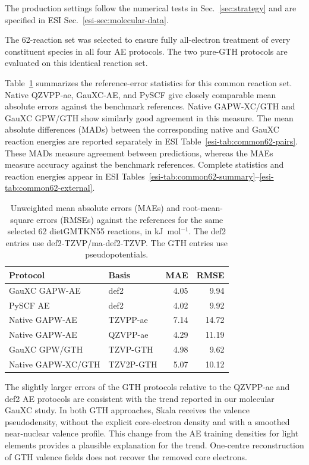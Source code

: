 \documentclass[10pt,a4paper,twocolumn]{article}
\begin{document}
 The production settings follow the numerical tests in Sec.~\ref{sec:strategy} and are specified in ESI Sec.~\ref{esi-sec:molecular-data}.

The 62-reaction set was selected to ensure fully all-electron treatment of every constituent species in all four AE protocols. The two pure-GTH protocols are evaluated on this identical reaction set. %

Table~\ref{tab:molecular-errors} summarizes the reference-error statistics for this common reaction set. Native QZVPP-ae, GauXC-AE, and PySCF give closely comparable mean absolute errors against the benchmark references. Native GAPW-XC/GTH and GauXC GPW/GTH show similarly good agreement in this measure. The mean absolute differences (MADs) between the corresponding native and GauXC reaction energies are reported separately in ESI Table~\ref{esi-tab:common62-pairs}. These MADs measure agreement between predictions, whereas the MAEs measure accuracy against the benchmark references. Complete statistics and reaction energies appear in ESI Tables~\ref{esi-tab:common62-summary}--\ref{esi-tab:common62-external}.


\begin{table}[tb]
\centering\small
\setlength{\tabcolsep}{3pt}
\caption{Unweighted mean absolute errors (MAEs) and root-mean-square errors (RMSEs) against the references for the same selected 62 dietGMTKN55 reactions, in kJ~mol$^{-1}$. The def2 entries use def2-TZVP/ma-def2-TZVP. The GTH entries use pseudopotentials.}
\label{tab:molecular-errors}
\begin{tabular}{@{}llrr@{}}
\toprule
Protocol & Basis & MAE & RMSE \\
\midrule
GauXC GAPW-AE & def2 & 4.05 & 9.94 \\
PySCF AE & def2 & 4.02 & 9.92 \\
Native GAPW-AE & TZVPP-ae & 7.14 & 14.72 \\
Native GAPW-AE & QZVPP-ae & 4.29 & 11.19 \\
\midrule
GauXC GPW/GTH & TZVP-GTH & 4.98 & 9.62 \\
Native GAPW-XC/GTH & TZV2P-GTH & 5.07 & 10.12 \\
\bottomrule
\end{tabular}
\end{table}


The slightly larger errors of the GTH protocols relative to the QZVPP-ae and def2 AE protocols are consistent with the trend reported in our molecular GauXC study.\cite{Poeschel2026MolecularSkala} In both GTH approaches, Skala receives the valence pseudodensity, without the explicit core-electron density and with a smoothed near-nuclear valence profile. This change from the AE training densities for light elements provides a plausible explanation for the trend. One-centre reconstruction of GTH valence fields does not recover the removed core electrons.
\end{document}
